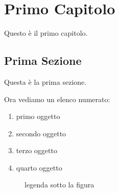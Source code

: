 \documentclass[12pt,a4paper,openright,twoside]{report}
\begin{document}
                                        \chapter{Primo Capitolo}                %
                                        \lhead[\fancyplain{}{\bfseries\thepage}]{\fancyplain{}{\bfseries\rightmark}}
                                        Questo \`e il primo capitolo.
                                        \section{Prima Sezione}                 %
                                        Questa \`e la prima sezione.
                                        
                                        Ora vediamo un elenco numerato:         %
                                        \begin{enumerate}
                                        \item primo oggetto
                                        \item secondo oggetto
                                        \item terzo oggetto
                                        \item quarto oggetto
                                        \end{enumerate}
                                        
                                        \begin{figure}[h]                       %
                                        \begin{center}                          %
                                        \caption[legenda elenco figure]{legenda sotto la figura}\label{fig:prima}
                                        \end{center}
                                        \end{figure}
                                        
\end{document}

